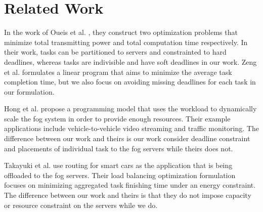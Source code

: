 \section{Related Work}

\label{s1}















In the work of Oueis et al. \cite{fogba}, they construct two optimization problems that minimize total transmitting power and total computation time respectively. In their work, tasks can be partitioned to servers and constrainted to hard deadlines, whereas tasks are indivisible and have soft deadlines in our work. Zeng et al. \cite{jopt} formulates a linear program that aims to minimize the average task completion time, but we also focus on avoiding missing deadlines for each task in our formulation.


Hong et al. \cite{smallfogcar} propose a programming model that uses the workload to dynamically scale the fog system in order to provide enough resources. Their example applications include vehicle-to-vehicle video streaming and traffic monitoring. The difference between our work and theirs is our work consider deadline constraint and placements of individual task to the fog servers while theirs does not.


Takayuki et al. \cite{serviceo} use routing for smart cars as the application that is being offloaded to the fog servers. Their load balancing optimization formulation focuses on minimizing aggregated task finishing time under an energy constraint. The difference between our work and theirs is that they do not impose capacity or resource constraint on the servers while we do. %


